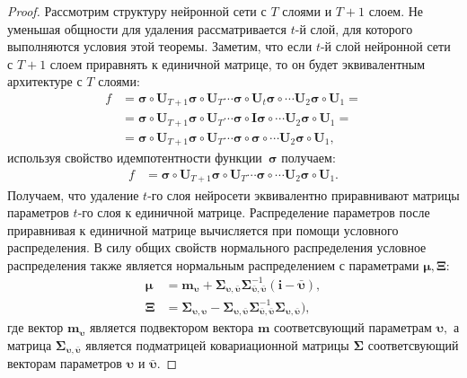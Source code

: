 \begin{proof}
Рассмотрим структуру нейронной сети с $T$ слоями и $T+1$ слоем. Не уменьшая общности для удаления рассматривается $t$-й слой, для которого выполняются условия этой теоремы. Заметим, что если $t$-й слой нейронной сети с $T+1$ слоем приравнять к единичной матрице, то он будет эквивалентным архитектуре с $T$ слоями:
\[
\begin{aligned}
f &= \bm{\sigma} \circ \mathbf{U}_{T+1}\bm{\sigma} \circ \mathbf{U}_T \cdots \bm{\sigma} \circ \mathbf{U}_t\bm{\sigma} \circ \cdots  \mathbf{U}_2\bm{\sigma} \circ \mathbf{U}_1 =\\
&=  \bm{\sigma} \circ \mathbf{U}_{T+1}\bm{\sigma} \circ \mathbf{U}_T \cdots \bm{\sigma} \circ \mathbf{I}\bm{\sigma} \circ \cdots  \mathbf{U}_2\bm{\sigma} \circ \mathbf{U}_1 =\\
&=  \bm{\sigma} \circ \mathbf{U}_{T+1}\bm{\sigma} \circ \mathbf{U}_T \cdots \bm{\sigma} \circ \bm{\sigma} \circ \cdots  \mathbf{U}_2\bm{\sigma} \circ \mathbf{U}_1,
\end{aligned}
\]
используя свойство идемпотентности функции~$\bm{\sigma}$ получаем:
\[
\label{eq:ap:tr:2:1}
\begin{aligned}
f &= \bm{\sigma} \circ \mathbf{U}_{T+1}\bm{\sigma} \circ \mathbf{U}_T \cdots \bm{\sigma} \circ \cdots  \mathbf{U}_2\bm{\sigma} \circ \mathbf{U}_1.
\end{aligned}
\]
Получаем, что удаление $t$-го слоя нейросети эквивалентно приравнивают матрицы параметров $t$-го слоя к единичной матрице. Распределение параметров после приравнивая к единичной матрице вычисляется при помощи условного распределения. В силу общих свойств нормального распределения условное распределения также является нормальным распределением с параметрами $\bm{\mu}, \bm{\Xi}:$
\[
\label{eq:ap:tr:2:2}
\begin{aligned}
\bm{\mu} &= \mathbf{m}_{\bm{\upsilon}}+\bm{\Sigma}_{\bm{\upsilon},\bar{\bm{\upsilon}}} \bm{\Sigma}_{\bar{\bm{\upsilon}},\bar{\bm{\upsilon}}}^{-1} \left(\mathbf{i} - \bar{\bm{\upsilon}}\right), \\
\bm{\Xi} &= \bm{\Sigma}_{\bm{\upsilon},\bm{\upsilon}} - \bm{\Sigma}_{\bm{\upsilon},\bar{\bm{\upsilon}}}\bm{\Sigma}_{\bar{\bm{\upsilon}},\bar{\bm{\upsilon}}}^{-1}\bm{\Sigma}_{\bm{\upsilon},\bar{\bm{\upsilon}}}\bigr),
\end{aligned}
\]
где вектор $\mathbf{m}_{\bm{\upsilon}}$ является подвектором вектора $\mathbf{m}$ соответсвующий параметрам $\bm{\upsilon},$ а матрица $\bm{\Sigma}_{\bm{\upsilon},\bar{\bm{\upsilon}}}$ является подматрицей ковариационной матрицы $\bm{\Sigma}$ соответсвующий векторам параметров $\bm{\upsilon}$ и $\bar{\bm{\upsilon}}.$
\end{proof}

